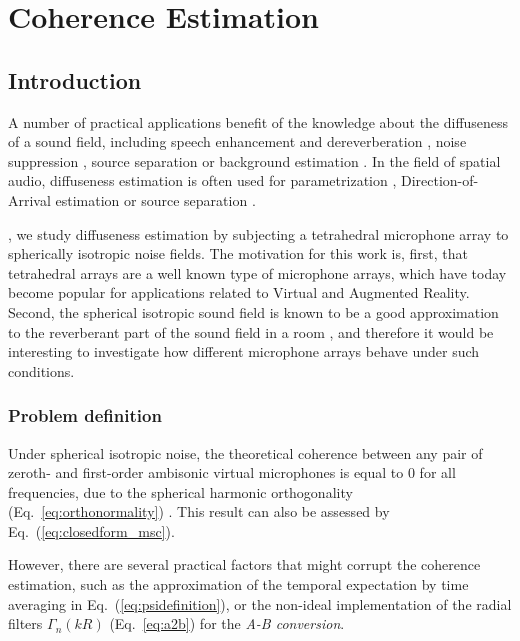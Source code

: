 \chapter{Coherence Estimation}



\section{Introduction}

A number of practical applications benefit of the knowledge about the diffuseness of a sound field, including speech enhancement and dereverberation \cite{p_habets_dual-microphone_2006}, noise suppression \cite{ito_designing_2010}, source separation \cite{duong_under-determined_2009} or background estimation \cite{stefanakis_foreground_2015}. In the field of spatial audio, diffuseness estimation is often used for parametrization \cite{pulkki_directional_2006, politis_compass_2018}, Direction-of-Arrival estimation \cite{thiergart_localization_2009} or source separation \cite{motlicek_real-time_2013}.

, we study diffuseness estimation by subjecting a tetrahedral microphone array to spherically isotropic noise fields.
The motivation for this work is, first, that tetrahedral arrays are a well known type of microphone arrays, which have today become popular for applications related to Virtual and Augmented Reality. 
Second, the spherical isotropic sound field is known to be a good approximation to the reverberant part of the sound field in a room \cite{elko_spatial_2001, mccowan_microphone_2003}, and therefore it would be interesting to investigate how different microphone arrays behave under such conditions.




\subsection{Problem definition}

Under spherical isotropic noise, the theoretical coherence between any pair of zeroth- and first-order ambisonic virtual microphones is equal to 0 for all frequencies, due to the spherical harmonic orthogonality (Eq.~\ref{eq:orthonormality}) \cite{elko_spatial_2001}. This result can also be assessed by Eq.~(\ref{eq:closedform_msc}).

However, there are several practical factors that might corrupt the coherence estimation, such as the approximation of the temporal expectation by time averaging \cite{thiergart_diffuseness_2011} in Eq.~(\ref{eq:psidefinition}), or the non-ideal implementation of the radial filters $\Gamma_n(kR)$ (Eq.~\ref{eq:a2b}) for the \textit{A-B conversion}\cite{schorkhuber_ambisonic_2017}.

